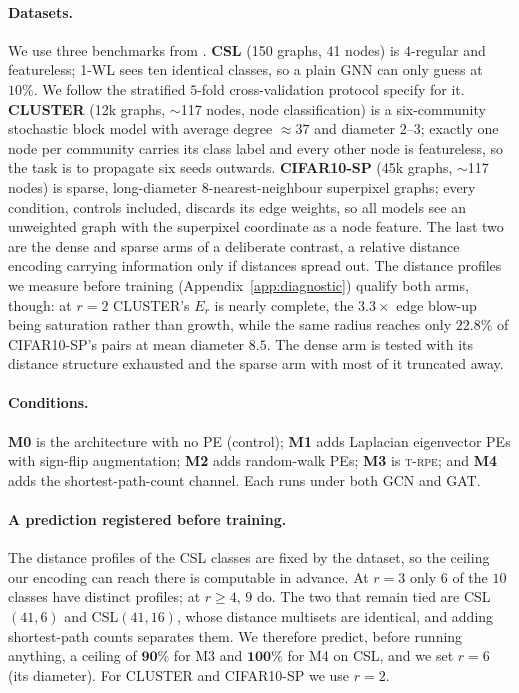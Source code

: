 \documentclass[11pt]{article}
\newcommand{\TRPE}{\textsc{t-rpe}}
\begin{document}
\paragraph{Datasets.}
We use three benchmarks from \citet{dwivedi2023benchmarking}. \textbf{CSL} (150 graphs, 41
nodes) is $4$-regular and featureless; 1-WL sees ten identical classes, so a plain GNN can only
guess at $10\%$. We follow the stratified $5$-fold cross-validation protocol
\citet{dwivedi2023benchmarking} specify for it. \textbf{CLUSTER} (12k graphs, $\sim$117 nodes,
node classification) is a six-community stochastic block model with average degree $\approx37$
and diameter $2$--$3$; exactly one node per community carries its class label and every other
node is featureless, so the task is to propagate six seeds outwards. \textbf{CIFAR10-SP} (45k
graphs, $\sim$117 nodes) is sparse, long-diameter $8$-nearest-neighbour superpixel graphs; every
condition, controls included, discards its edge weights, so all models see an unweighted graph
with the superpixel coordinate as a node feature. The last two are the dense and sparse arms of a
deliberate contrast, a relative distance encoding carrying information only if distances spread
out. The distance profiles we measure before training
(Appendix~\ref{app:diagnostic}) qualify both arms, though: at $r=2$ CLUSTER's $E_r$ is nearly
complete, the $3.3\times$ edge blow-up being saturation rather than growth, while the same radius
reaches only $22.8\%$ of CIFAR10-SP's pairs at mean diameter $8.5$. The dense arm is tested with
its distance structure exhausted and the sparse arm with most of it truncated away.

\paragraph{Conditions.}
\textbf{M0} is the architecture with no PE (control); \textbf{M1} adds Laplacian eigenvector
PEs with sign-flip augmentation; \textbf{M2} adds random-walk PEs; \textbf{M3} is \TRPE{}; and
\textbf{M4} adds the shortest-path-count channel. Each runs under both GCN and GAT.

\paragraph{A prediction registered before training.}
The distance profiles of the CSL classes are fixed by the dataset, so the ceiling our encoding
can reach there is computable in advance. At $r=3$ only $6$ of the $10$ classes have distinct
profiles; at $r\geq4$, $9$ do. The two that remain tied are CSL$(41,6)$ and CSL$(41,16)$, whose
distance multisets are identical, and adding shortest-path counts separates them. We therefore
predict, before running anything, a ceiling of $\mathbf{90\%}$ for M3 and $\mathbf{100\%}$ for M4
on CSL, and we set $r=6$ (its diameter). For CLUSTER and CIFAR10-SP we use $r=2$.
\end{document}
